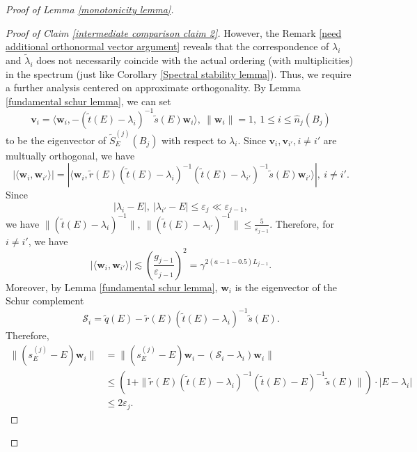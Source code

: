\documentclass[11pt,reqno,UTF8,twoside]{amsart}
\newcommand{\bfv}{\mathbf{v}}
\newcommand{\bfw}{\mathbf{w}}
\newcommand{\tq}{\tilde{q}}
\newcommand{\ts}{\tilde{s}}
\newcommand{\tr}{\tilde{r}}
\renewcommand{\tt}{\tilde{t}}
\newcommand{\mcS}{\mathcal{S}}
\newcommand{\whn}{\widehat{n}}
\newcommand{\wtlambda}{\widetilde{\lambda}}
\newcommand{\wtSj}{\widetilde{S}^{(j)}}
\newcommand{\smallSj}{s^{(j)}}
\theoremstyle{definition}
\numberwithin{equation}{section}
\begin{document}
\begin{proof}[Proof of Lemma \ref{monotonicity lemma}]
\begin{proof}[Proof of  Claim \ref{intermediate comparison claim 2}]
  However,  the Remark \ref{need additional orthonormal vector argument} reveals that the correspondence of $\lambda_i$ and $\wtlambda_i$ does not necessarily coincide with the actual ordering (with multiplicities) in the spectrum (just like Corollary \ref{Spectral stability lemma}). Thus, we require a further analysis centered on approximate orthogonality. By Lemma \ref{fundamental schur lemma}, we can set 
  \[\bfv_i=\langle \bfw_i,-(\tt(E)-\lambda_i)^{-1}\ts(E) \bfw_i\rangle,\ \| \bfw_i \|=1,\ 1\leq i\leq \whn_j(B_j)\]
  to be the eigenvector of $\wtSj_E(B_j)$ with respect to $\lambda_i$. Since $\bfv_i,\bfv_{i'},i\neq i'$ are multually orthogonal, we have 
  \[|\langle \bfw_i,\bfw_{i'} \rangle |=| \langle  \bfw_i,\tr(E) (\tt(E)-\lambda_i)^{-1} (\tt(E)-\lambda_{i'})^{-1} \ts(E)\bfw_{i'}  \rangle| ,\ i\neq i'.\]
  Since 
  \[|\lambda_i-E|,\ |\lambda_{i'}-E|\leq \varepsilon_j\ll \varepsilon_{j-1},\]
  we have $\| (\tt(E)-\lambda_{i})^{-1} \|,\ \| (\tt(E)-\lambda_{i'})^{-1}\|\leq \frac{5}{\varepsilon_{j-1}}$. Therefore, for $i\neq i'$,  we have 
  \begin{equation}\label{orthogonality 1}
      |\langle \bfw_i,\bfw_{i'} \rangle | \lesssim (\frac{g_{j-1}}{\varepsilon_{j-1}})^2 =\gamma^{2(a-1-0.5)L_{j-1}}.
  \end{equation}
  Moreover, by Lemma \ref{fundamental schur lemma}, $\bfw_i$ is the eigenvector of the Schur complement
  \[\mcS_i=\tq(E)-\tr(E)(\tt(E)-\lambda_i)^{-1}\ts(E) .\]
  Therefore,
  \begin{align*}
    \| (\smallSj_E-E) \bfw_i \| &= \|  (\smallSj_E-E) \bfw_i - (\mcS_i-\lambda_i) \bfw_i\| \\
         & \leq (1+\| \tr(E) (\tt(E)-\lambda_i)^{-1} (\tt(E)-E)^{-1} \ts(E) \|) \cdot |E-\lambda_i| \\
         & \leq 2 \varepsilon_{j}.
  \end{align*}


\end{proof}
\end{proof}
\end{document}

